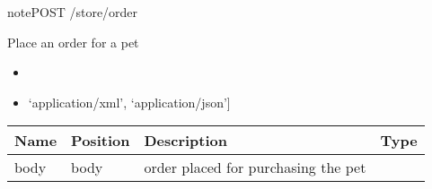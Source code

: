 \documentclass[letterpaper,10pt,english]{sphinxmanual}
\begin{document}
\begin{sphinxadmonition}{note}{POST /store/order}

Place an order for a pet\begin{itemize}
\item {} 

\item {} 
\sphinxstylestrong{Produces: 
}{[}‘application/xml’, ‘application/json’{]}

\end{itemize}




\begin{savenotes}\sphinxattablestart
\centering
\begin{tabulary}{\linewidth}[t]{|T|T|T|T|}
\hline
\sphinxstyletheadfamily 
Name
&\sphinxstyletheadfamily 
Position
&\sphinxstyletheadfamily 
Description
&\sphinxstyletheadfamily 
Type
\\
\hline
body
&
body
&
order placed for purchasing the pet
&

\\
\hline
\end{tabulary}
\par
\sphinxattableend\end{savenotes}



\end{sphinxadmonition}
\end{document}
